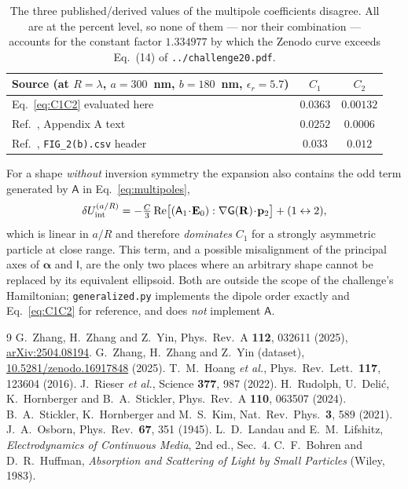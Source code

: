 \documentclass[11pt,a4paper]{article}
\newcommand{\bal}{\boldsymbol{\alpha}}
\newcommand{\Gsf}{\mathsf{G}}
\begin{document}
\begin{table}[h]
\centering\small
\begin{tabular}{lcc}
\toprule
Source (at $R=\lambda$, $a=300$~nm, $b=180$~nm, $\epsilon_r=5.7$)
 & $C_1$ & $C_2$ \\
\midrule
Eq.~\eqref{eq:C1C2} evaluated here            & $0.0363$ & $0.00132$ \\
Ref.~\cite{Zhang2025}, Appendix A text        & $0.0252$ & $0.0006$ \\
Ref.~\cite{Zenodo}, \texttt{FIG\_2(b).csv} header & $0.033$ & $0.012$ \\
\bottomrule
\end{tabular}
\caption{The three published/derived values of the multipole coefficients
disagree.  All are at the percent level, so none of them --- nor their
combination --- accounts for the constant factor $1.334977$ by which the Zenodo
curve exceeds Eq.~(14) of \texttt{../challenge20.pdf}.}
\label{tab:C1C2}
\end{table}

\noindent
For a shape \emph{without} inversion symmetry the expansion also contains the
odd term generated by $\mathsf A$ in Eq.~\eqref{eq:multipoles},
\begin{equation}
  \delta U_{\rm int}^{(a/R)}
  =-\tfrac{C}{3}\operatorname{Re}
  \bigl[(\mathsf A_1\!\cdot\!\mathbf E_0):\nabla\Gsf(\mathbf R)\!\cdot\!\mathbf p_2\bigr]
  +(1\leftrightarrow2),
\end{equation}
which is linear in $a/R$ and therefore \emph{dominates} $C_1$ for a strongly
asymmetric particle at close range.  This term, and a possible misalignment of
the principal axes of $\bal$ and $\mathsf I$, are the only two places where an
arbitrary shape cannot be replaced by its equivalent ellipsoid.  Both are
outside the scope of the challenge's Hamiltonian; \texttt{generalized.py}
implements the dipole order exactly and Eq.~\eqref{eq:C1C2} for reference, and
does \emph{not} implement $\mathsf A$.

\begin{thebibliography}{9}
 G.~Zhang, H.~Zhang and Z.~Yin,
Phys.\ Rev.\ A \textbf{112}, 032611 (2025),
\href{https://arxiv.org/abs/2504.08194}{arXiv:2504.08194}.
 G.~Zhang, H.~Zhang and Z.~Yin (dataset),
\href{https://doi.org/10.5281/zenodo.16917848}{10.5281/zenodo.16917848} (2025).
 T.~M.~Hoang \emph{et al.},
Phys.\ Rev.\ Lett.\ \textbf{117}, 123604 (2016).
 J.~Rieser \emph{et al.}, Science \textbf{377}, 987 (2022).
 H.~Rudolph, U.~Deli\'c, K.~Hornberger and B.~A.~Stickler,
Phys.\ Rev.\ A \textbf{110}, 063507 (2024).
 B.~A.~Stickler, K.~Hornberger and M.~S.~Kim,
Nat.\ Rev.\ Phys.\ \textbf{3}, 589 (2021).
 J.~A.~Osborn, Phys.\ Rev.\ \textbf{67}, 351 (1945).
 L.~D.~Landau and E.~M.~Lifshitz,
\emph{Electrodynamics of Continuous Media}, 2nd ed., Sec.~4.
 C.~F.~Bohren and D.~R.~Huffman,
\emph{Absorption and Scattering of Light by Small Particles} (Wiley, 1983).
\end{thebibliography}
\end{document}
